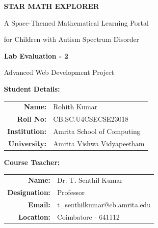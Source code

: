 \documentclass[12pt, a4paper]{article}
\begin{document}
\begin{titlepage}
    \centering
    \vspace*{2cm}
    
    {\Huge\bfseries\color{spacepurple} STAR MATH EXPLORER\par}
    \vspace{0.5cm}
    {\Large\color{electricblue} A Space-Themed Mathematical Learning Portal\par}
    {\Large\color{electricblue} for Children with Autism Spectrum Disorder\par}
    
    \vspace{2cm}
    
    \begin{tcolorbox}[colback=electricblue!5, colframe=spacepurple, width=0.8\textwidth, arc=5mm]
        \centering
        {\Large\textbf{Lab Evaluation - 2}\par}
        \vspace{0.5cm}
        {\large Advanced Web Development Project\par}
    \end{tcolorbox}
    
    \vspace{2cm}
    
    \begin{tcolorbox}[colback=stargold!10, colframe=spaceblue, width=0.8\textwidth, arc=3mm]
        \centering
        \textbf{Student Details:}\\[0.3cm]
        \begin{tabular}{rl}
            \textbf{Name:} & Rohith Kumar\\[0.2cm]
            \textbf{Roll No:} & CB.SC.U4CSECSE23018\\[0.2cm]
            \textbf{Institution:} & Amrita School of Computing\\[0.2cm]
            \textbf{University:} & Amrita Vishwa Vidyapeetham\\[0.2cm]
        \end{tabular}
    \end{tcolorbox}
    
    \vspace{2cm}
    
    \begin{tcolorbox}[colback=aliengreen!10, colframe=nebulapink, width=0.8\textwidth, arc=3mm]
        \centering
        \textbf{Course Teacher:}\\[0.3cm]
        \begin{tabular}{rl}
            \textbf{Name:} & Dr. T. Senthil Kumar\\[0.2cm]
            \textbf{Designation:} & Professor\\[0.2cm]
            \textbf{Email:} & t\_senthilkumar@cb.amrita.edu\\[0.2cm]
            \textbf{Location:} & Coimbatore - 641112\\[0.2cm]
        \end{tabular}
    \end{tcolorbox}
    

\end{titlepage}
\end{document}
